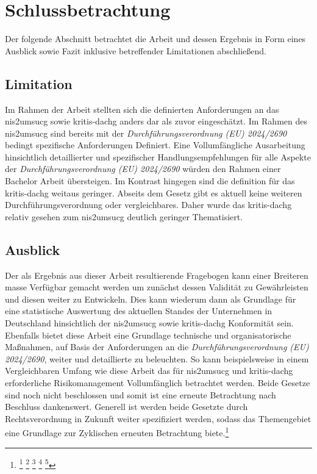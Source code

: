 \documentclass[11pt,a4paper,hidelinks]{article}   %
\begin{document}
    \newpage
    \section{Schlussbetrachtung}
        Der folgende Abschnitt betrachtet die Arbeit und dessen Ergebnis in Form eines Ausblick sowie Fazit inklusive betreffender Limitationen abschließend. 
        \subsection{Limitation}
        Im Rahmen der Arbeit stellten sich die definierten Anforderungen an das \gls{nis2umsucg} sowie \gls{kritis-dachg} anders dar als zuvor eingeschätzt. Im Rahmen des \gls{nis2umsucg} sind bereits mit der \emph{Durchführungsverordnung (EU) 2024/2690} bedingt spezifische Anforderungen Definiert. Eine Vollumfängliche Ausarbeitung hinsichtlich detaillierter und spezifischer Handlungsempfehlungen für alle Aspekte der \emph{Durchführungsverordnung (EU) 2024/2690} würden den Rahmen einer Bachelor Arbeit übersteigen. Im Kontrast hingegen sind die definition für das \gls{kritis-dachg} weitaus geringer. Abseits dem Gesetz gibt es aktuell keine weiteren Durchführungsverordnung oder vergleichbares. Daher wurde das \gls{kritis-dachg} relativ gesehen zum \gls{nis2umsucg} deutlich geringer Thematisiert.
        \subsection{Ausblick}
        Der als Ergebnis aus dieser Arbeit resultierende Fragebogen kann einer Breiteren masse Verfügbar gemacht werden um zunächst dessen Validität zu Gewährleisten und diesen weiter zu Entwickeln. Dies kann wiederum dann als Grundlage für eine statistische Auswertung des aktuellen Standes der Unternehmen in Deutschland hinsichtlich der \gls{nis2umsucg} sowie \gls{kritis-dachg} Konformität sein. Ebenfalls bietet diese Arbeit eine Grundlage technische und organisatorische Maßnahmen, auf Basis der Anforderungen an die \emph{Durchführungsverordnung (EU) 2024/2690}, weiter und detaillierte zu beleuchten. So kann beispielsweise in einem Vergleichbaren Umfang wie diese Arbeit das für \gls{nis2umsucg} und \gls{kritis-dachg} erforderliche Risikomanagement Vollumfänglich betrachtet werden. Beide Gesetze sind noch nicht beschlossen und somit ist eine erneute Betrachtung nach Beschluss dankenswert. Generell ist werden beide Gesetzte durch Rechtsverordnung in Zukunft weiter spezifiziert werden, sodass das Themengebiet eine Grundlage zur Zyklischen erneuten Betrachtung biete.\footnote{
            \footcite[Vgl.][, §125]{BTGO}
            \footcite[Vgl.][, S. 1]{brd:c54cf9}
            \footcite[Vgl.][, S. 52]{brd:4a7cbe}
            \footcite[Vgl.][, S. 2]{bmi:98905b}
            \footcite[Vgl.][, Artikel 80]{GG}
        }
\end{document}
